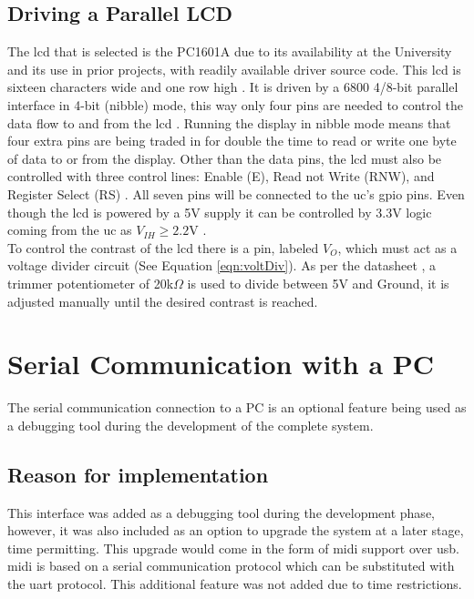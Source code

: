 \documentclass[12pt,a4paper]{report}
\begin{document}
\subsection{Driving a Parallel LCD}
The \ac{lcd} that is selected is the PC1601A \cite{lcd} due to its availability at the University and its use in prior projects, with readily available driver source code. This \ac{lcd} is sixteen characters wide and one row high \cite{lcd}. It is driven by a 6800 4/8-bit parallel interface in 4-bit (nibble) mode, this way only four pins are needed to control the data flow to and from the \ac{lcd} \cite{lcd}. Running the display in nibble mode means that four extra pins are being traded in for double the time to read or write one byte of data to or from the display. Other than the data pins, the \ac{lcd} must also be controlled with three control lines: Enable (E), Read not Write (RNW), and Register Select (RS) \cite{lcd}. All seven pins will be connected to the \ac{uc}'s \ac{gpio} pins. Even though the \ac{lcd} is powered by a 5V supply it can be controlled by 3.3V logic coming from the \ac{uc} as $V_{IH} \geq 2.2\text{V}$ \cite{lcd}.\\
To control the contrast of the \ac{lcd} there is a pin, labeled $V_O$, which must act as a voltage divider circuit (See Equation \ref{eqn:voltDiv}). As per the datasheet \cite{lcd}, a trimmer potentiometer of 20k$\Omega$ is used to divide between 5V and Ground, it is adjusted manually until the desired contrast is reached.
\section{Serial Communication with a PC}
The serial communication connection to a PC is an optional feature being used as a debugging tool during the development of the complete system.
\subsection{Reason for implementation}
This interface was added as a debugging tool during the development phase, however, it was also included as an option to upgrade the system at a later stage, time permitting. This upgrade would come in the form of \ac{midi} support over \ac{usb}. \ac{midi} is based on a serial communication protocol \cite{midiUart} which can be substituted with the \ac{uart} protocol. This additional feature was not added due to time restrictions. 
\end{document}
